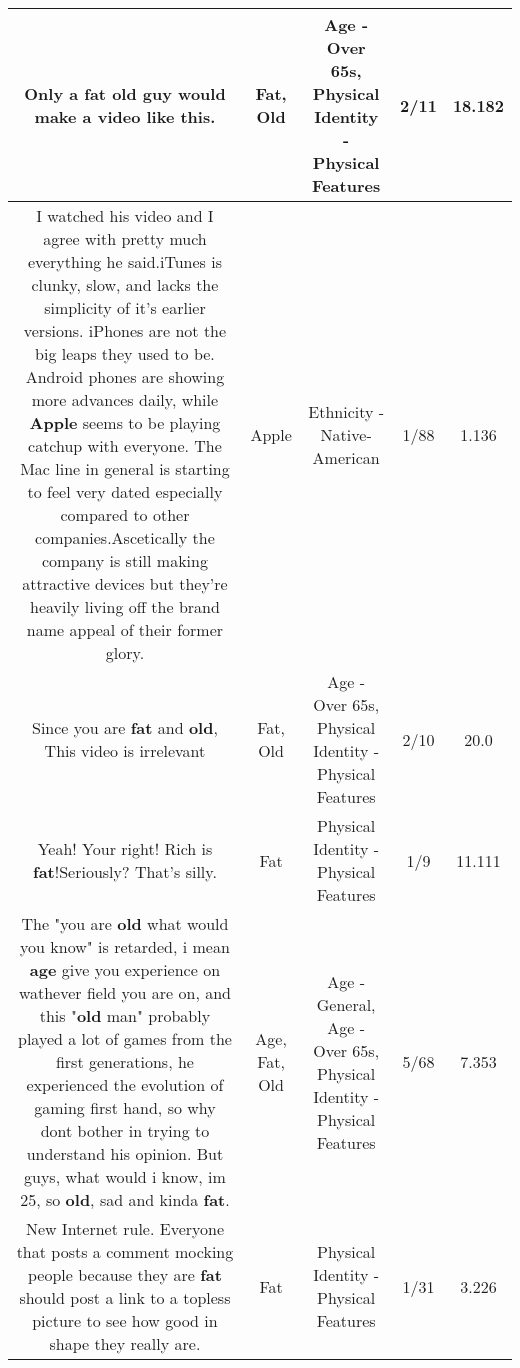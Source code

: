 \documentclass[11pt]{article}
\newlength\mylength
\begin{document}
\begin{center}
\begin{longtable}{|C{.65\mylength}|C{.30\mylength}|C{.12\mylength}|C{.12\mylength}|C{.12\mylength}|}
  \small Only a \textbf{fat} \textbf{old} guy would make a video like this.\normalsize   & Fat, Old & Age - Over 65s, Physical Identity - Physical Features & 2/11 & 18.182 \\  \hline
  \small I watched his video and I agree with pretty much everything he said.iTunes is clunky, slow, and lacks the simplicity of it's earlier versions. iPhones are not the big leaps they used to be. Android phones are showing more advances daily, while \textbf{Apple} seems to be playing catchup with everyone. The Mac line in general is starting to feel very dated especially compared to other companies.Ascetically the company is still making attractive devices but they're heavily living off the brand name appeal of their former glory.\normalsize   & Apple & Ethnicity - Native-American & 1/88 & 1.136 \\  \hline
  \small Since you are \textbf{fat} and \textbf{old}, This video is irrelevant\normalsize   & Fat, Old & Age - Over 65s, Physical Identity - Physical Features & 2/10 & 20.0 \\  \hline
  \small Yeah! Your right! Rich is \textbf{fat}!Seriously? That's silly.\normalsize   & Fat & Physical Identity - Physical Features & 1/9 & 11.111 \\  \hline
  \small The "you are \textbf{old} what would you know" is retarded,  i mean \textbf{age} give you experience on wathever field you are on, and this "\textbf{old} man" probably played a lot of games from the first generations, he experienced the evolution of gaming first hand, so why dont bother in trying to understand his opinion. But guys, what would i know, im 25, so \textbf{old}, sad and kinda \textbf{fat}.\normalsize   & Age, Fat, Old & Age - General, Age - Over 65s, Physical Identity - Physical Features & 5/68 & 7.353 \\  \hline
  \small New Internet rule. Everyone that posts a comment mocking people because they are \textbf{fat} should post a link to a topless picture to see how good in shape they really are.\normalsize   & Fat & Physical Identity - Physical Features & 1/31 & 3.226 \\  \hline

\end{longtable}
\end{center}
\end{document}
